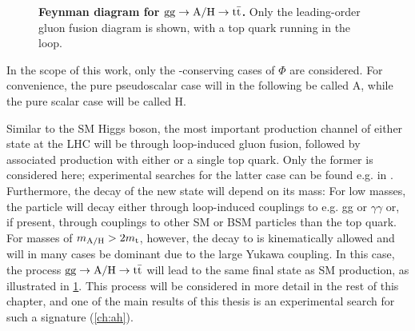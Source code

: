 \begin{figure}[!t]
    \centering
    \caption{\textbf{Feynman diagram for $\mathrm{gg \rightarrow A/H \rightarrow \mathrm{t \bar{t}}}$.} Only the leading-order gluon fusion diagram is shown, with a top quark running in the loop.}
    \label{fig:theory:ggAH}
\end{figure}

In the scope of this work, only the \CP-conserving cases of $\Phi$ are considered. For convenience, the pure pseudoscalar case will in the following be called A, while the pure scalar case will be called H.

Similar to the SM Higgs boson, the most important production channel of either state at the LHC will be through loop-induced gluon fusion, followed by associated production with either \ttbar or a single top quark. Only the former is considered here; experimental searches for the latter case can be found e.g. in . Furthermore, the decay of the new state will depend on its mass: For low masses, the particle will decay either through loop-induced couplings to e.g. gg or $\gamma \gamma$ or, if present, through couplings to other SM or BSM particles than the top quark. For masses of $m_{\mathrm{A/H}} > 2 m_{\mathrm{t}}$, however, the decay to \ttbar is kinematically allowed and will in many cases be dominant due to the large Yukawa coupling. In this case, the process $\mathrm{gg \rightarrow A/H \rightarrow \mathrm{t \bar{t}}}$ will lead to the same final state as SM \ttbar production, as illustrated in \cref{fig:theory:ggAH}. This process will be considered in more detail in the rest of this chapter, and one of the main results of this thesis is an experimental search for such a signature (\cref{ch:ah}).




